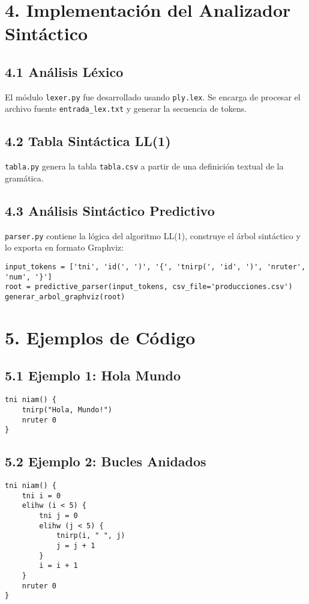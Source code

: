 \documentclass[12pt]{article}
\begin{document}
\section*{4. Implementación del Analizador Sintáctico}

\subsection*{4.1 Análisis Léxico}
El módulo \texttt{lexer.py} fue desarrollado usando \texttt{ply.lex}. Se encarga de procesar el archivo fuente \texttt{entrada\_lex.txt} y generar la secuencia de tokens.

\subsection*{4.2 Tabla Sintáctica LL(1)}
\texttt{tabla.py} genera la tabla \texttt{tabla.csv} a partir de una definición textual de la gramática.

\subsection*{4.3 Análisis Sintáctico Predictivo}
\texttt{parser.py} contiene la lógica del algoritmo LL(1), construye el árbol sintáctico y lo exporta en formato Graphviz:

\begin{verbatim}
input_tokens = ['tni', 'id(', ')', '{', 'tnirp(', 'id', ')', 'nruter', 'num', '}']
root = predictive_parser(input_tokens, csv_file='producciones.csv')
generar_arbol_graphviz(root)
\end{verbatim}

\section*{5. Ejemplos de Código}

\subsection*{5.1 Ejemplo 1: Hola Mundo}
\begin{verbatim}
tni niam() {
    tnirp("Hola, Mundo!")
    nruter 0
}
\end{verbatim}

\subsection*{5.2 Ejemplo 2: Bucles Anidados}
\begin{verbatim}
tni niam() {
    tni i = 0
    elihw (i < 5) {
        tni j = 0
        elihw (j < 5) {
            tnirp(i, " ", j)
            j = j + 1
        }
        i = i + 1
    }
    nruter 0
}
\end{verbatim}
\end{document}
